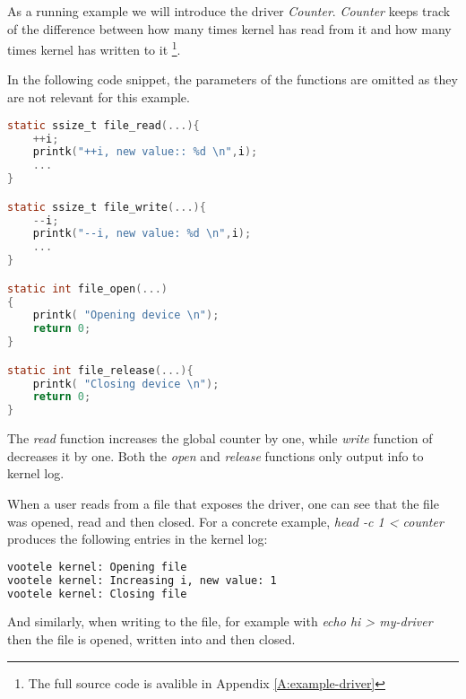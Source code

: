 \documentclass[..thesis.tex]{subfiles}
\begin{document}
As a running example we will introduce the driver \textit{Counter}. \textit{Counter} keeps track of the difference between how many times kernel has read from it and how many times kernel has written to it \footnote{The full source code is avalible in Appendix \ref{A:example-driver}}.

In the following code snippet, the parameters of the functions are omitted as they are not relevant for this example.



\begin{lstlisting}[language=C,style=def]
static ssize_t file_read(...){
    ++i;
    printk("++i, new value:: %d \n",i);
    ...
}

static ssize_t file_write(...){
    --i;
    printk("--i, new value: %d \n",i);
    ...
}

static int file_open(...)
{
    printk( "Opening device \n");
    return 0;
}

static int file_release(...){
    printk( "Closing device \n");
    return 0;
}


\end{lstlisting}


The \textit{read} function increases the global counter by one, while \textit{write} function of decreases it by one. Both the \textit{open} and \textit{release} functions only output info to kernel log.

When a user reads from a file that exposes the driver, one can see that the file was opened, read and then closed. For a concrete example,
\textit{head -c 1 < counter} produces the following entries in the kernel log:

\begin{lstlisting}[language=sh,style=def]
vootele kernel: Opening file 
vootele kernel: Increasing i, new value: 1 
vootele kernel: Closing file 
\end{lstlisting}

And similarly, when writing to the file, for example with \textit{echo hi > my-driver} then the file is opened, written into and then closed.
\end{document}
